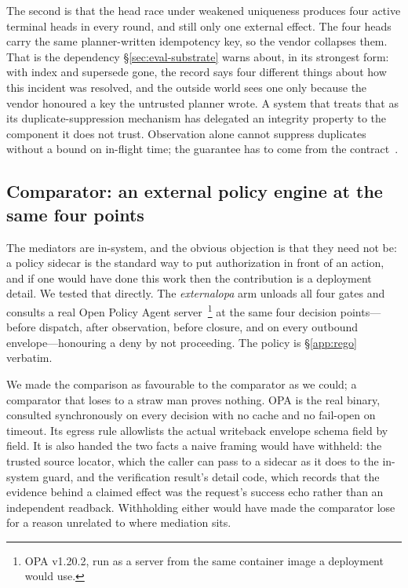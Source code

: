 \documentclass[acmsmall,manuscript,review,anonymous]{acmart}
\renewcommand{\_}{\discretionary{\textunderscore}{}{\textunderscore}}
\begin{document}
The second is that the head race under weakened uniqueness produces four active
terminal heads in every round, and still only one external effect. The four heads
carry the same planner-written idempotency key, so the vendor collapses them. That
is the dependency \S\ref{sec:eval-substrate} warns about, in its strongest
form: with index and supersede gone, the record says four different things
about how this incident was resolved, and the outside world sees one only
because the vendor honoured a key the untrusted planner wrote. A system that treats that as its duplicate-suppression
mechanism has delegated an integrity property to the component it does not trust.
Observation alone cannot suppress duplicates without a bound on in-flight
time; the guarantee has to come from the contract~\cite{li2026exactlyonce}.

\subsection{Comparator: an external policy engine at the same four points}
\label{sec:eval-comparator}

The mediators are in-system, and the obvious objection is that they need not be:
a policy sidecar is the standard way to put authorization in front of an action,
and if one would have done this work then the contribution is a deployment detail.
We tested that directly. The \emph{external\_opa} arm unloads all four gates and
consults a real Open Policy Agent server~\cite{opa2025}\footnote{OPA v1.20.2, run
as a server from the same container image a deployment would use.} at the same four decision
points---before dispatch, after observation, before closure, and on every outbound
envelope---honouring a deny by not proceeding. The policy is
\S\ref{app:rego} verbatim.

We made the comparison as favourable to the comparator as we could; a
comparator that loses to a straw man proves nothing. OPA is the real binary,
consulted synchronously on every decision with no cache and no fail-open on
timeout. Its egress rule allowlists the actual writeback envelope schema field
by field. It is also handed the two facts a naive framing would have withheld:
the trusted source locator, which the caller can pass to a sidecar as it does to
the in-system guard, and the verification result's detail code, which records
that the evidence behind a claimed effect was the request's success echo rather
than an independent readback. Withholding either would have made the comparator
lose for a reason unrelated to where mediation sits.
\end{document}
